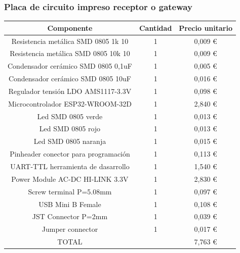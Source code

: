 \documentclass[paper=a4, fontsize=11pt,twoside]{scrartcl}	%
\begin{document}
            \subsubsection{Placa de circuito impreso receptor o gateway}
                \begin{center}
                    \begin{tabular}{||c | c |c ||} 
                    \hline
                    Componente & Cantidad & Precio unitario  \\ [0.5ex] 
                    \hline
                    Resistencia metálica SMD 0805 1k 10  	&1&	 0,009 € \\ 
                    Resistencia metálica SMD 0805 10k 10 	&1&	 0,009 € \\ 
                    Condensador cerámico SMD 0805 0,1uF  	&1&	 0,005 € \\ 
                    Condensador cerámico SMD 0805 10uF   	&1&	 0,016 € \\ 
                    Regulador tensión LDO AMS1117-3.3V   	&1&	 0,098 € \\ 
                    Microcontrolador ESP32-WROOM-32D     	&1&	 2,840 € \\ 
                    Led SMD 0805 verde                   	&1&	 0,013 € \\ 
                    Led SMD 0805 rojo                    	&1&	 0,013 € \\ 
                    Led SMD 0805 naranja                 	&1&	 0,015 € \\ 
                    Pinheader conector para programación 	&1&	 0,113 € \\ 
                    UART-TTL herramienta de dasarrollo   	&1&	 1,540 € \\ 
                    Power Module AC-DC HI-LINK 3.3V	        &1&	 2,830 € \\ 
                    Screw terminal P=5.08mm	                &1&	 0,097 € \\ 
                    USB Mini B Female                    	&1&	 0,108 € \\ 
                    JST Connector P=2mm                  	&1&	 0,039 € \\ 
                    Jumper connector	                    &1&	 0,017 € \\ 
                    \hline
                    TOTAL                    	            &&	 7,763 € \\ 
                    \end{tabular}
                \end{center}
\end{document}
